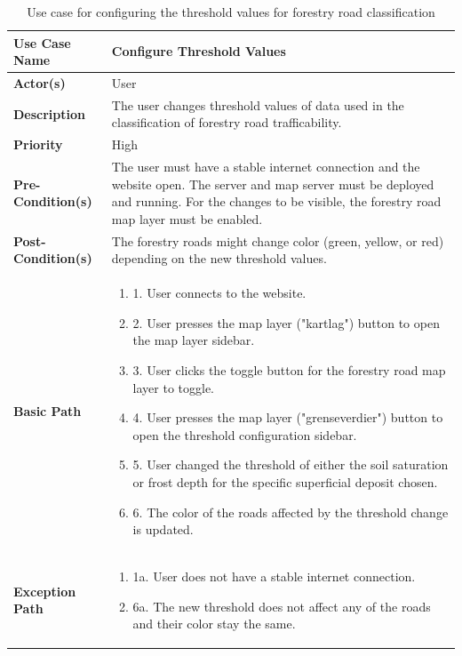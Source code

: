\begin{table}[h]
    \centering
    \renewcommand{\arraystretch}{1.5}
    \begin{tabularx}{\textwidth}{|l|X|}
        \hline
        \rowcolor{gray!20}
        \textbf{Use Case Name} & Configure Threshold Values \\
        \hline
        \textbf{Actor(s)} & User \\
        \hline
        \textbf{Description} & The user changes threshold values of data used in the classification of forestry road trafficability. \\
        \hline
        \textbf{Priority} & High \\
        \hline
        \textbf{Pre-Condition(s)} & The user must have a stable internet connection and the website open. The server and map server must be deployed and running. For the changes to be visible, the forestry road map layer must be enabled. \\
        \hline
        \textbf{Post-Condition(s)} & The forestry roads might change color (green, yellow, or red) depending on the new threshold values. \\
        \hline
        \textbf{Basic Path} &  
        \begin{enumerate}[label=,left=0pt]
            \item 1. User connects to the website. 
            \item 2. User presses the map layer ("kartlag") button to open the map layer sidebar.
            \item 3. User clicks the toggle button for the forestry road map layer to toggle.
            \item 4. User presses the map layer ("grenseverdier") button to open the threshold configuration sidebar.
            \item 5. User changed the threshold of either the soil saturation or frost depth for the specific superficial deposit chosen.
            \item 6. The color of the roads affected by the threshold change is updated.
        \end{enumerate} \\
        \hline
        \textbf{Exception Path} & 
        \begin{enumerate}[label=,left=0pt]
            \item 1a. User does not have a stable internet connection.
            \item 6a. The new threshold does not affect any of the roads and their color stay the same.
        \end{enumerate} \\
        \hline
    \end{tabularx}
    \caption*{Use case for configuring the threshold values for forestry road classification}
    \label{tab:use_case_threshold_values_appendix}
\end{table}

